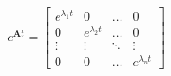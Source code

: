 \documentclass[preview]{standalone}
\begin{document}
\begin{align*}
e^{\mathbf{A}t} = \begin{bmatrix} e^{\lambda_1 t} & 0 & \dots & 0 \\ 0 & e^{\lambda_2 t} & \dots & 0 \\ \vdots & \vdots & \ddots & \vdots \\ 0 & 0 & \dots & e^{\lambda_n t} \end{bmatrix}
\end{align*}
\end{document}
